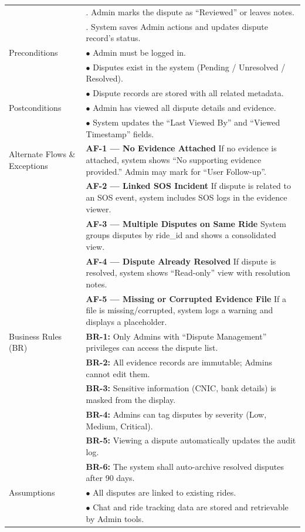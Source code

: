 \begin{longtable}{|>{\raggedright\arraybackslash}p{4cm}|>{\raggedright\arraybackslash}p{11cm}|}
& 7. Admin marks the dispute as ``Reviewed'' or leaves notes. \\
& 8. System saves Admin actions and updates dispute record's status. \\
\hline
Preconditions & $\bullet$ Admin must be logged in. \\
& $\bullet$ Disputes exist in the system (Pending / Unresolved / Resolved). \\
& $\bullet$ Dispute records are stored with all related metadata. \\
\hline
Postconditions & $\bullet$ Admin has viewed all dispute details and evidence. \\
& $\bullet$ System updates the ``Last Viewed By'' and ``Viewed Timestamp'' fields. \\
Alternate Flows \& Exceptions & \textbf{AF-1 — No Evidence Attached} \newline If no evidence is attached, system shows ``No supporting evidence provided.'' Admin may mark for ``User Follow-up''. \\
& \textbf{AF-2 — Linked SOS Incident} \newline If dispute is related to an SOS event, system includes SOS logs in the evidence viewer. \\
& \textbf{AF-3 — Multiple Disputes on Same Ride} \newline System groups disputes by ride\_id and shows a consolidated view. \\
& \textbf{AF-4 — Dispute Already Resolved} \newline If dispute is resolved, system shows ``Read-only'' view with resolution notes. \\
 & \textbf{AF-5 — Missing or Corrupted Evidence File} \newline If a file is missing/corrupted, system logs a warning and displays a placeholder. \\
\hline
Business Rules (BR) & \textbf{BR-1:} Only Admins with ``Dispute Management'' privileges can access the dispute list. \\
 & \textbf{BR-2:} All evidence records are immutable; Admins cannot edit them. \\
 & \textbf{BR-3:} Sensitive information (CNIC, bank details) is masked from the display. \\
 & \textbf{BR-4:} Admins can tag disputes by severity (Low, Medium, Critical). \\
& \textbf{BR-5:} Viewing a dispute automatically updates the audit log. \\
& \textbf{BR-6:} The system shall auto-archive resolved disputes after 90 days. \\
\hline
Assumptions & $\bullet$ All disputes are linked to existing rides. \\
& $\bullet$ Chat and ride tracking data are stored and retrievable by Admin tools. \\
\hline
\end{longtable}

